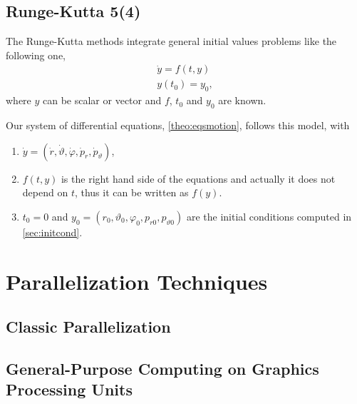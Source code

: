 \subsection{Runge-Kutta 5(4)}

The Runge-Kutta methods integrate general initial values problems like the following one,
\begin{align*}
	\dot{y} = f(t,y) \\
	y(t_0) = y_0,
\end{align*}
where $y$ can be scalar or vector and $f$, $t_0$ and $y_0$ are known.

Our system of differential equations, \autoref{theo:eqsmotion}, follows this model, with
\begin{enumerate}
	\item $\dot{y} = (\dot{r}, \dot{\vartheta}, \dot{\varphi}, \dot{p}_r, \dot{p}_\vartheta)$,
	\item $f(t,y)$ is the right hand side of the equations and actually it does not depend on $t$, thus it can be written as $f(y)$.
	\item $t_0 = 0$ and $y_0 = (r_0, \vartheta_0, \varphi_0, p_{r0}, p_{\vartheta0})$ are the initial conditions computed in \autoref{sec:initcond}.
\end{enumerate}

\section{Parallelization Techniques}
\subsection{Classic Parallelization}
\subsection{General-Purpose Computing on Graphics Processing Units}